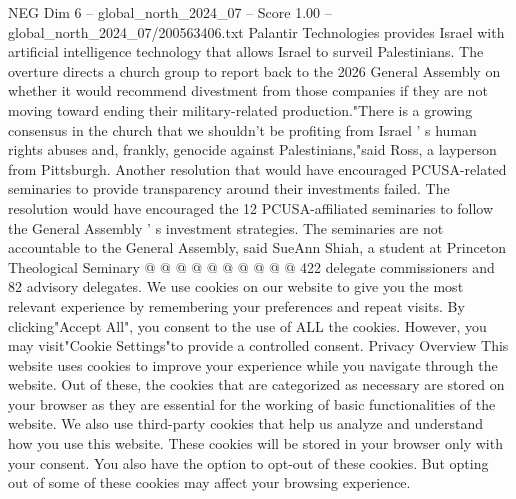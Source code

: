 \begin{textsample}{NEG Dim 6 – global\_north\_2024\_07 – Score 1.00 – global\_north\_2024\_07/200563406.txt}
Palantir Technologies provides Israel with artificial intelligence technology that allows Israel to surveil Palestinians.
The overture directs a church group to report back to the 2026 General Assembly on whether it would recommend divestment from those companies if they are not moving toward ending their military-related production."There is a growing consensus in the church that we shouldn't be profiting from Israel ' s human rights abuses and, frankly, genocide against Palestinians,"said Ross, a layperson from Pittsburgh.
Another resolution that would have encouraged PCUSA-related seminaries to provide transparency around their investments failed.
The resolution would have encouraged the 12 PCUSA-affiliated seminaries to follow the General Assembly ' s investment strategies.
The seminaries are not accountable to the General Assembly, said SueAnn Shiah, a student at Princeton Theological Seminary @ @ @ @ @ @ @ @ @ @ 422 delegate commissioners and 82 advisory delegates.
We use cookies on our website to give you the most relevant experience by remembering your preferences and repeat visits.
By clicking"Accept All", you consent to the use of ALL the cookies.
However, you may visit"Cookie Settings"to provide a controlled consent.
Privacy Overview This website uses cookies to improve your experience while you navigate through the website.
Out of these, the cookies that are categorized as necessary are stored on your browser as they are essential for the working of basic functionalities of the website.
We also use third-party cookies that help us analyze and understand how you use this website.
These cookies will be stored in your browser only with your consent.
You also have the option to opt-out of these cookies.
But opting out of some of these cookies may affect your browsing experience.

\end{textsample}
